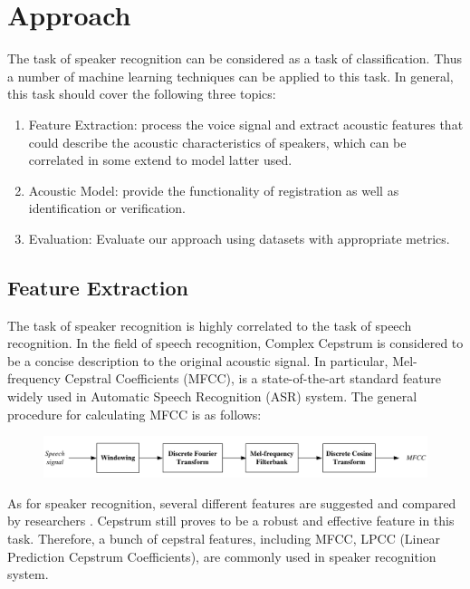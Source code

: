 

\section{Approach}
The task of speaker recognition can be considered as a task of classification. Thus a number of machine learning techniques
can be applied to this task. In general, this task should cover the following three topics:

\begin{enumerate}
  \item Feature Extraction: process the voice signal and extract acoustic features that
	  could describe the acoustic characteristics of speakers, which can be correlated
	  in some extend to model latter used.

  \item Acoustic Model: provide the functionality of registration as well as identification or verification.

  \item Evaluation: Evaluate our approach using datasets with appropriate metrics.
\end{enumerate}

\subsection{Feature Extraction}
The task of speaker recognition is highly correlated to the task of speech recognition.
In the field of speech recognition, Complex Cepstrum \cite{cepstrum} is
considered to be a concise description to the original acoustic signal.
In particular, Mel-frequency Cepstral Coefficients (MFCC), is a state-of-the-art standard feature
widely used in Automatic Speech Recognition (ASR) system.
The general procedure for calculating MFCC is as follows:
\begin{figure}[H]
  \centering
  \includegraphics[width=\textwidth]{res/MFCC.png}
\end{figure}

As for speaker recognition, several different features are suggested and compared
by researchers \cite{evaluation}. Cepstrum still proves to be a robust and effective
feature in this task. Therefore, a bunch of cepstral features, including MFCC,
LPCC (Linear Prediction Cepstrum Coefficients), are commonly used
in speaker recognition system.\cite{feature}

